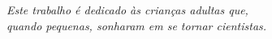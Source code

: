 \documentclass[
	12pt,				%
	openright,			%
	twoside,			%
	a4paper,			%
	english,			%
	brazilian				%
	]{abntex2}
\begin{document}

    
        

      
  

\begin{dedicatoria}
   \vspace*{\fill}
   \centering
   \noindent
   \textit{Este trabalho é dedicado às crianças adultas que,\\
   quando pequenas, sonharam em se tornar cientistas.} \vspace*{\fill}
\end{dedicatoria}

\end{document}
